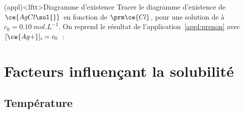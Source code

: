 \documentclass[../../main/main.tex]{subfiles}
\begin{document}
\begin{tcb*}(appl)<lftt>{Diagramme d'existence }
	Tracer le diagramme d'existence de $\ce{AgCl\sol{}}$ en fonction de $\prm
		\ce{Cl}$, pour une solution de  à $c_0 = \SI{0.10}{mol.L^{-1}}$.
	\tcblower
	On reprend le résultat de l'application~\ref{appl:prenon} avec $[\ce{Ag+}]_i =
		c_0$~:
	\vspace{-15pt}
	\begin{center}
	\end{center}
\end{tcb*}

\section{Facteurs influençant la solubilité}
\subsection{Température}
\end{document}
